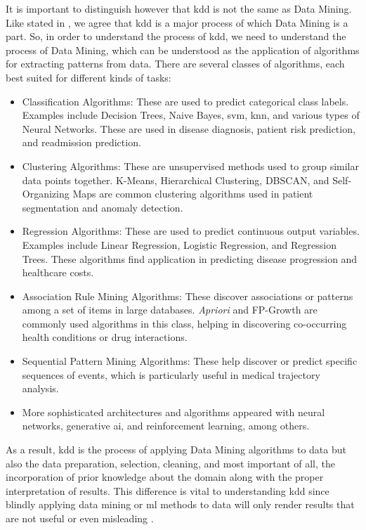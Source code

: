 It is important to distinguish however that \ac{kdd} is not the same as Data Mining. Like stated in \cite{Fayyad_Piatetsky-Shapiro_Smyth_1996}, we agree that \ac{kdd} is a major process of which Data Mining is a part. So, in order to understand the process of \ac{kdd}, we need to understand the process of Data Mining, which can be understood as the application of algorithms for extracting patterns from data. There are several classes of algorithms, each best suited for different kinds of tasks:
\begin{itemize}
    \item Classification Algorithms: These are used to predict categorical class labels. Examples include Decision Trees, Naive Bayes, \ac{svm}, \ac{knn}, and various types of Neural Networks. These are used in disease diagnosis, patient risk prediction, and readmission prediction.
\item Clustering Algorithms: These are unsupervised methods used to group similar data points together. K-Means, Hierarchical Clustering, DBSCAN, and Self-Organizing Maps are common clustering algorithms used in patient segmentation and anomaly detection.

\item Regression Algorithms: These are used to predict continuous output variables. Examples include Linear Regression, Logistic Regression, and Regression Trees. These algorithms find application in predicting disease progression and healthcare costs.

\item Association Rule Mining Algorithms: These discover associations or patterns among a set of items in large databases. \textit{Apriori} and FP-Growth are commonly used algorithms in this class, helping in discovering co-occurring health conditions or drug interactions.
\item Sequential Pattern Mining Algorithms: These help discover or predict specific sequences of events, which is particularly useful in medical trajectory analysis.

\item More sophisticated architectures and algorithms appeared with neural networks, generative \ac{ai}, and reinforcement learning, among others.

\end{itemize}

As a result, \ac{kdd} is the process of applying Data Mining algorithms to data but also the data preparation, selection, cleaning, and most important of all, the incorporation of prior knowledge about the domain along with the proper interpretation of results. This difference is vital to understanding \ac{kdd} since blindly applying data mining or \ac{ml} methods to data will only render results that are not useful or even misleading \cite{Fayyad_Piatetsky-Shapiro_Smyth_1996}.

